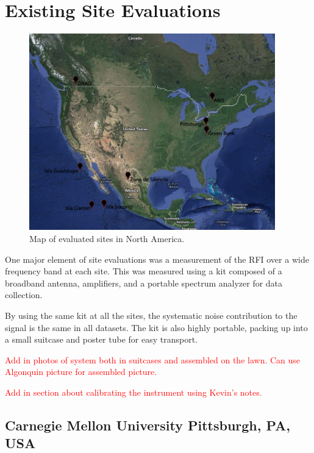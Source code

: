 \section{Existing Site Evaluations}

\begin{figure}[htb]
\begin{center}
\includegraphics[width=0.95\textwidth]{RFI_testing/figures/large_scale_site_map.jpg}
\caption{Map of evaluated sites in North America.}
\label{Fig:site_map}
\end{center}
\end{figure}

One major element of site evaluations was a measurement of the RFI over a wide frequency band at each site. This was measured using a kit composed of a broadband antenna, amplifiers, and a portable spectrum analyzer for data collection. 

By using the same kit at all the sites, the systematic noise contribution to the signal is the same in all datasets. The kit is also highly portable, packing up into a small suitcase and poster tube for easy transport. 

\textcolor{red}{Add in photos of system both in suitcases and assembled on the lawn. Can use Algonquin picture for assembled picture. }

\textcolor{red}{Add in section about calibrating the instrument using Kevin's notes.}

\subsection{Carnegie Mellon University Pittsburgh, PA, USA}

